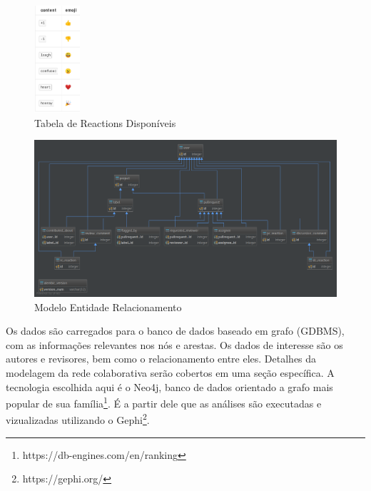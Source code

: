\documentclass[a4paper,12pt]{monografia}
\theoremstyle{plain}
\theoremstyle{definition}
\theoremstyle{remark}
\begin{document}
\begin{figure}[!htbp]
 \centering
 \includegraphics[height=150]{reactions}
 \caption{Tabela de Reactions Disponíveis}\label{fig:reactions}
\end{figure}

\begin{figure}[!htbp]
 \includegraphics[width=\textwidth]{mer}
 \caption{Modelo Entidade Relacionamento}\label{fig:mer}
\end{figure}

Os dados são carregados para o banco de dados baseado em grafo (GDBMS), com as informações relevantes nos nós e arestas. Os dados de interesse são os autores e revisores, bem como o relacionamento entre eles. Detalhes da modelagem da rede colaborativa serão cobertos em uma seção específica. A tecnologia escolhida aqui é o Neo4j, banco de dados orientado a grafo mais popular de sua família\footnote{https://db-engines.com/en/ranking}. É a partir dele que as análises são executadas e vizualizadas utilizando o Gephi\footnote{https://gephi.org/}.
\end{document}
